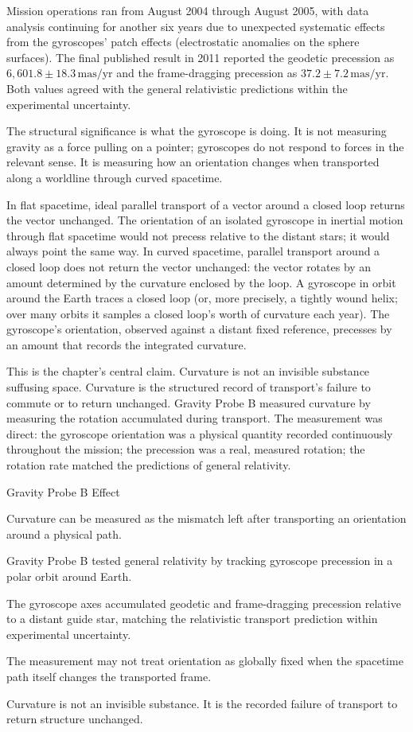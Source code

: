 Mission operations ran from August 2004 through August 2005, with data
analysis continuing for another six years due to unexpected systematic
effects from the gyroscopes' patch effects (electrostatic anomalies on the
sphere surfaces). The final published result in 2011 reported the geodetic
precession as $6{,}601{.}8 \pm 18{.}3\,\mathrm{mas/yr}$ and the
frame-dragging precession as $37{.}2 \pm 7{.}2\,\mathrm{mas/yr}$. Both
values agreed with the general relativistic predictions within the
experimental uncertainty.

The structural significance is what the gyroscope is doing. It is not
measuring gravity as a force pulling on a pointer; gyroscopes do not
respond to forces in the relevant sense. It is measuring how an orientation
changes when transported along a worldline through curved spacetime.

In flat spacetime, ideal parallel transport of a vector around a closed
loop returns the vector unchanged. The orientation of an isolated gyroscope
in inertial motion through flat spacetime would not precess relative to
the distant stars; it would always point the same way. In curved spacetime,
parallel transport around a closed loop does not return the vector
unchanged: the vector rotates by an amount determined by the curvature
enclosed by the loop. A gyroscope in orbit around the Earth traces a
closed loop (or, more precisely, a tightly wound helix; over many orbits
it samples a closed loop's worth of curvature each year). The gyroscope's
orientation, observed against a distant fixed reference, precesses by an
amount that records the integrated curvature.

This is the chapter's central claim. Curvature is not an invisible
substance suffusing space. Curvature is the structured record of
transport's failure to commute or to return unchanged. Gravity Probe B
measured curvature by measuring the rotation accumulated during transport.
The measurement was direct: the gyroscope orientation was a physical
quantity recorded continuously throughout the mission; the precession
was a real, measured rotation; the rotation rate matched the
predictions of general relativity.

\begin{phenom}{Gravity Probe B Effect}
\label{ph:gravity-probe-b-effect}

\PhStatement Curvature can be measured as the mismatch left after transporting
an orientation around a physical path.

\PhOrigin Gravity Probe B tested general relativity by tracking gyroscope
precession in a polar orbit around Earth.

\PhObservation The gyroscope axes accumulated geodetic and frame-dragging
precession relative to a distant guide star, matching the relativistic
transport prediction within experimental uncertainty.

\PhConstraint The measurement may not treat orientation as globally fixed when
the spacetime path itself changes the transported frame.

\PhConsequence Curvature is not an invisible substance. It is the recorded
failure of transport to return structure unchanged.

\end{phenom}

